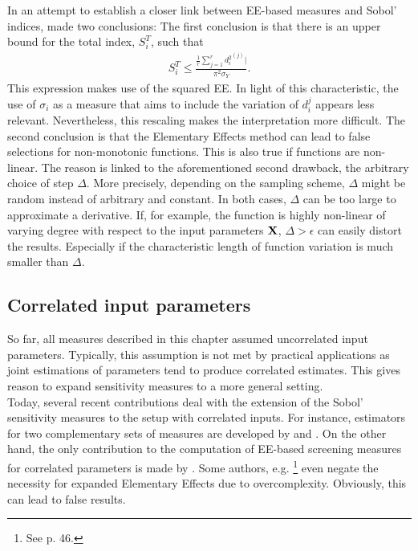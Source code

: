 In an attempt to establish a closer link between EE-based measures and Sobol' indices, \cite{kucherenko2009derivative} made two conclusions: The first conclusion is that there is an upper bound for the total index, $S_i^T$, such that
\begin{align}
S_i^T \leq \frac{\frac{1}{r} \sum_{j=1}^{r} {d_i^2}^{(j)}|}{\pi^2 \sigma_Y}.
\end{align}
This expression makes use of the squared EE. In light of this characteristic, the use of $\sigma_i$ as a measure that aims to include the variation of $d_i^{j}$ appears less relevant. Nevertheless, this rescaling makes the interpretation more difficult. The second conclusion is that the Elementary Effects method can lead to false selections for non-monotonic functions. This is also true if functions are non-linear. The reason is linked to the aforementioned second drawback, the arbitrary choice of step $\Delta$. More precisely, depending on the sampling scheme, $\Delta$ might be random instead of arbitrary and constant. In both cases, $\Delta$ can be too large to approximate a derivative. If, for example, the function is highly non-linear of varying degree with respect to the input parameters $\bold{X}$, $\Delta > \epsilon$ can easily distort the results. Especially if the characteristic length of function variation is much smaller than $\Delta$.\\



\subsection{Correlated input parameters}

So far, all measures described in this chapter assumed uncorrelated input parameters. Typically, this assumption is not met by practical applications as joint estimations of parameters tend to produce correlated estimates. This gives reason to expand sensitivity measures to a more general setting.\\

\noindent
Today, several recent contributions deal with the extension of the Sobol' sensitivity measures to the setup with correlated inputs. For instance, estimators for two complementary sets of measures are developed by \cite{kucherenko2012estimation} and \cite{mara2015non}.
On the other hand, the only contribution to the computation of EE-based screening measures for correlated parameters is made by \cite{ge2017extending}. Some authors, e.g. \cite{Saltelli.2004}\footnote{See p. 46.} even negate the necessity for expanded Elementary Effects due to overcomplexity. Obviously, this can lead to false results.\\

